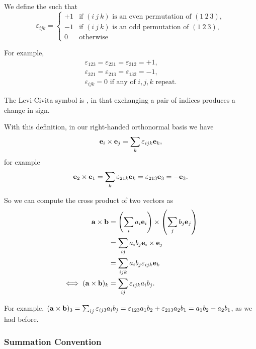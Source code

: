 \documentclass[a4paper]{scrartcl}
\begin{document}
\begin{definition}
    We define the  such that
    $$
    \varepsilon_{ijk} = \begin{cases}
        +1 &\mbox{if } (i\ j\ k) \text{ is an even permutation of } (1\ 2\ 3), \\
        -1 &\mbox{if } (i\ j\ k) \text{ is an odd permutation of } (1\ 2\ 3), \\ 
        0 &\mbox{otherwise}
       \end{cases}
    $$
\end{definition}

For example,
\begin{align*}
    \varepsilon_{123} =  \varepsilon_{231} =  \varepsilon_{312} = +1, \\
    \varepsilon_{321} =  \varepsilon_{213} =  \varepsilon_{132} = -1, \\
    \varepsilon_{ijk} = 0 \text{ if any of } i,j,k \text{ repeat.}
\end{align*}

The Levi-Civita symbol is , in that exchanging a pair of indices produces a change in sign.

With this definition, in our right-handed orthonormal basis we have
$$
\mathbf{e}_i \times \mathbf{e}_j = \sum_k \varepsilon_{ijk} \mathbf{e}_k,
$$
for example
$$
\mathbf{e}_2 \times \mathbf{e}_1 = \sum_k \varepsilon_{21k}\mathbf{e}_k = \varepsilon_{213} \mathbf{e}_3 = - \mathbf{e}_3.
$$

So we can compute the cross product of two vectors as
\begin{align*}
    \mathbf{a}\times \mathbf{b} &= \left(\sum_i a_i \mathbf{e}_i\right) \times \left(\sum_j b_j \mathbf{e}_j\right) \\
    &= \sum_{ij} a_i b_j \mathbf{e}_i \times \mathbf{e}_j \\
    &= \sum_{ijk} a_i b_j \varepsilon_{ijk} \mathbf{e}_k \\
\iff (\mathbf{a} \times \mathbf{b})_k &= \sum_{ij} \varepsilon_{ijk} a_i b_j.
\end{align*}

For example, $(\mathbf{a} \times \mathbf{b})_3 = \sum_{ij} \varepsilon_{ij3} a_i b_j = \varepsilon_{123} a_1 b_2 + \varepsilon_{213} a_2 b_1 = a_1 b_2 - a_2 b_1$, as we had before.

\subsubsection{Summation Convention}
\end{document}
